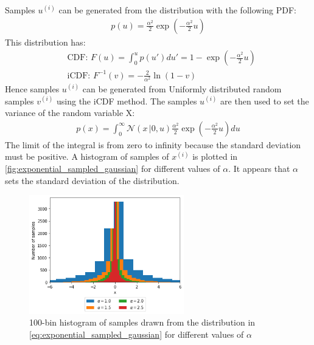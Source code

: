 \documentclass[a4paper]{article}
\begin{document}
Samples $u^{(i)}$ can be generated from the distribution with the following PDF:
\begin{align*}
    p(u) = \frac{\alpha^2}{2} \exp\left(-\frac{\alpha^2}{2} u \right)
\end{align*}
This distribution has:
\begin{align*}
    & \text{CDF: } F(u) = \int_0^u p(u') du' = 1 - \exp\left(-\frac{\alpha^2}{2} u\right) \\
    & \text{iCDF: } F^{-1}(v) = -\frac{2}{\alpha^2} \ln(1 - v)
\end{align*}
Hence samples $u^{(i)}$ can be generated from Uniformly distributed random samples $v^{(i)}$ using the iCDF method.
The samples $u^{(i)}$ are then used to set the variance of the random variable X:
\begin{align}\label{eq:exponential_sampled_gaussian}
    p(x) = \int_{0}^{\infty} \mathcal{N}(x\,|0, u) \frac{\alpha^2}{2} \exp\left(-\frac{\alpha^2}{2} u \right) du
\end{align}
The limit of the integral is from zero to infinity because the standard deviation must be positive.
A histogram of samples of $x^{(i)}$ is plotted in \autoref{fig:exponential_sampled_gaussian} for different values of
$\alpha$. It appears that $\alpha$ sets the standard deviation of the distribution.

\begin{figure}[h]
    \centering
    \includegraphics[width=0.6\textwidth]{figures/exponential_sampled_gaussian.png}
    \caption{100-bin histogram of samples drawn from the distribution in \autoref{eq:exponential_sampled_gaussian} for
    different values of $\alpha$}
    \label{fig:exponential_sampled_gaussian}
\end{figure}
\end{document}
